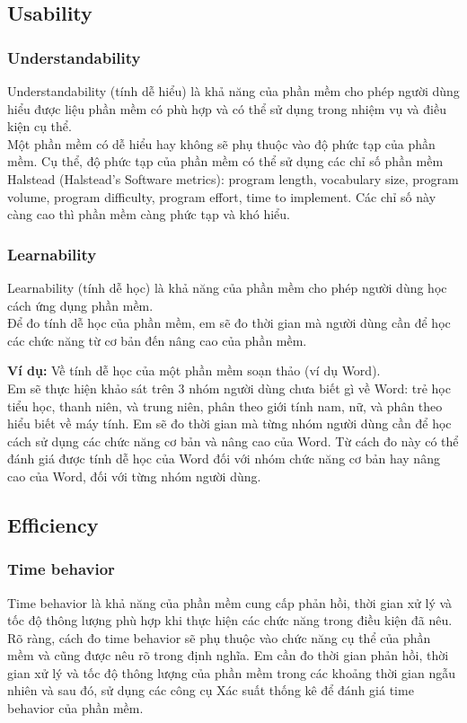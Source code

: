 \documentclass[14pt]{extarticle}
\begin{document}
\subsection{Usability}
\subsubsection{Understandability}
Understandability (tính dễ hiểu) là khả năng của phần mềm cho phép người dùng
hiểu được liệu phần mềm có phù hợp và có thể sử dụng trong nhiệm vụ và
điều kiện cụ thể.\\
Một phần mềm có dễ hiểu hay không sẽ phụ thuộc vào độ phức tạp của phần mềm.
Cụ thể, độ phức tạp của phần mềm có thể sử dụng các chỉ số phần mềm Halstead
(Halstead’s Software metrics):
program length, vocabulary size, program volume, program difficulty,
program effort, time to implement.
Các chỉ số này càng cao thì phần mềm càng phức tạp và khó hiểu.

\subsubsection{Learnability}
Learnability (tính dễ học) là khả năng của phần mềm cho phép người dùng
học cách ứng dụng phần mềm.\\
Để đo tính dễ học của phần mềm, em sẽ đo thời gian mà người dùng cần
để học các chức năng từ cơ bản đến nâng cao của phần mềm.

\textbf{Ví dụ:} Về tính dễ học của một phần mềm soạn thảo (ví dụ Word).\\
Em sẽ thực hiện khảo sát trên 3 nhóm người dùng chưa biết gì về Word:
trẻ học tiểu học, thanh niên, và trung niên,
phân theo giới tính nam, nữ, và phân theo hiểu biết về máy tính.
Em sẽ đo thời gian mà từng nhóm người dùng cần để học cách sử dụng
các chức năng cơ bản và nâng cao của Word.
Từ cách đo này có thể đánh giá được tính dễ học của Word đối với
nhóm chức năng cơ bản hay nâng cao của Word, đối với từng nhóm người dùng.





\subsection{Efficiency}
\subsubsection{Time behavior}
Time behavior là khả năng của phần mềm cung cấp
phản hồi, thời gian xử lý và tốc độ thông lượng phù hợp khi thực hiện các
chức năng trong điều kiện đã nêu.\\
Rõ ràng, cách đo time behavior sẽ phụ thuộc vào chức năng cụ thể của phần mềm
và cũng được nêu rõ trong định nghĩa.
Em cần đo thời gian phản hồi, thời gian xử lý và tốc độ thông lượng của phần mềm
trong các khoảng thời gian ngẫu nhiên và sau đó, sử dụng các công cụ Xác suất
thống kê để đánh giá time behavior của phần mềm.
\end{document}
